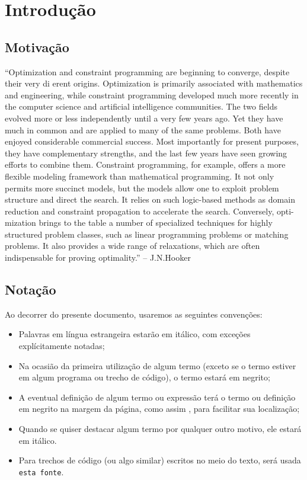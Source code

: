 \documentclass{article}
\begin{document}
\section*{Introdução}

\subsection*{Motivação}

``Optimization and constraint programming are beginning to converge,  despite  their very
di erent origins.  Optimization is primarily associated with mathematics and engineering,
while constraint programming developed much more recently in the computer science and
artificial intelligence communities.  The two  fields evolved more or less independently until
a very few years ago.   Yet they have much in common and are applied to many of the
same problems.  Both have enjoyed considerable commercial success.  Most importantly for
present purposes,  they have complementary  strengths,  and the last few years have  seen
growing efforts to combine them.
Constraint programming, for example, offers a more flexible modeling framework than
mathematical programming. It not only permits more succinct models, but the models allow
one to exploit problem structure and direct the search. It relies on such logic-based methods
as domain reduction and constraint propagation to accelerate the search.  Conversely, opti-
mization brings to the table a number of specialized techniques for highly structured problem
classes, such as linear programming problems or matching problems. It also provides a wide
range of relaxations, which are often indispensable for proving optimality.'' -- J.N.Hooker

\subsection*{Notação}
  Ao decorrer do presente documento, usaremos as seguintes convenções:

  \begin{itemize}
    \item Palavras em língua estrangeira estarão em itálico, com exceções explícitamente notadas;
    \item Na ocasião da primeira utilização de algum termo (exceto se o termo estiver em algum programa ou trecho de código), o termo estará em negrito;
    \item A eventual definição de algum termo ou expressão terá o termo ou definição em negrito na
      margem da página, como assim , para facilitar sua localização;
    \item Quando se quiser destacar algum termo por qualquer outro motivo, ele estará em itálico.
    \item Para trechos de código (ou algo similar) escritos no meio do texto, será usada {\tt esta fonte}.
  \end{itemize}
\end{document}

